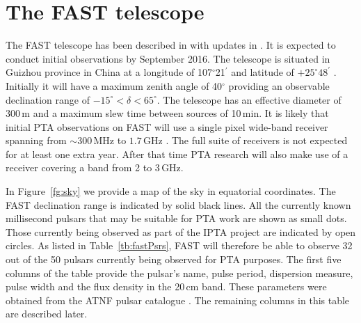 \documentclass{raa}            %
\begin{document}
\section{The FAST telescope}\label{sec:FAST}



The FAST telescope has been described in \cite{nlj+11} with updates in \cite{lnp13}. It is expected to conduct initial observations by September 2016. The telescope is situated in Guizhou province in China at a longitude of 107$^\circ$21$^\prime$ and latitude of $+25^\circ48^\prime$ .  Initially it will have a maximum zenith angle of 40$^\circ$ providing an observable declination range of $-15^\circ < \delta < 65^\circ$.  The telescope has an effective diameter of 300\,m and a maximum slew time between sources of 10\,min.  It is likely that initial PTA observations on FAST will use a single pixel wide-band receiver spanning from $\sim 300$\,MHz to $1.7$\,GHz \citep{lnp13}.  The full suite of receivers is not expected for at least one extra year.  After that time PTA research will also make use of a receiver covering a band from 2 to 3\,GHz. 

In Figure~\ref{fg:sky} we provide a map of the sky in equatorial coordinates.  The FAST declination range is indicated by solid black lines. All the currently known millisecond pulsars that may be suitable for PTA work are shown as small dots.  Those currently being observed as part of the IPTA project \citep{man13} are indicated by open circles.  As listed in Table~\ref{tb:fastPsrs}, FAST will therefore be able to observe 32 out of the 50 pulsars currently being observed for PTA purposes.  The first five columns of the table provide the pulsar's name, pulse period, dispersion measure, pulse width and the flux density in the 20\,cm band. These parameters were obtained from the ATNF pulsar catalogue \citep{mhth05}. The remaining columns in this table are described later.
\end{document}
